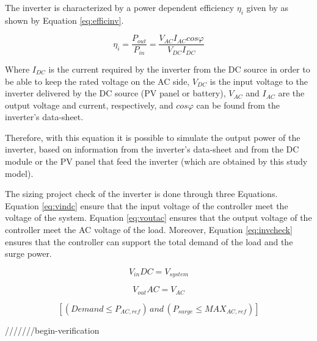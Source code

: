 The inverter is characterized by a power dependent efficiency $ \eta_{i} $ given by \cite{Hansen} as shown by Equation \ref{eq:efficinv}.

\begin{equation}
\label{eq:efficinv}
\eta_{i} = \dfrac{P_{out}}{P_{in}} = \dfrac{V_{AC} I_{AC} cos\varphi}{V_{DC}I_{DC}}
\end{equation}

Where $ I_{DC} $ is the current required by the inverter from the DC source in order to be able to keep the rated voltage on the AC side, $ V_{DC} $ is the input voltage to the inverter delivered by the DC source (PV panel or battery),  $ V_{AC}  $ and $ I_{AC} $ are the output voltage and current, respectively, and $ cos \varphi $ can be found from the inverter's data-sheet.

Therefore, with this equation it is possible to simulate the output power of the inverter, based on information from the inverter's data-sheet and from the DC module or the PV panel that feed the inverter (which are obtained by this study model). 

The sizing project check of the inverter is done through three Equations. Equation \ref{eq:vindc} ensure that the input voltage of the controller meet the voltage of the system. Equation \ref{eq:voutac} ensures that the output voltage of the controller meet the AC voltage of the load. Moreover, Equation \ref{eq:invcheck} ensures that the controller can support the total demand of the load and the surge power.

\begin{equation}
\label{eq:vindc} 
V_{in}DC = V_{system}
\end{equation}

\begin{equation}
\label{eq:voutac} 
V_{out}AC = V_{AC}
\end{equation}

\begin{equation}
\label{eq:invcheck} 
\left[ (Demand \leq P_{AC,ref}) \, and \, (P_{surge} \leq MAX_{AC,ref}) \right] 
\end{equation}


///////begin-verification 
